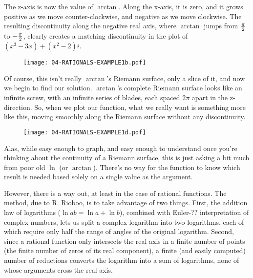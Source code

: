 The z-axis is now the value of $\arctan$.  Along the x-axis, it is
zero, and it grows positive as we move counter-clockwise, and negative
as we move clockwise.  The resulting discontinuity along the negative
real axis, where $\arctan$ jumps from $\pi\over2$ to $-{\pi\over2}$,
clearly creates a matching discontinuity in the plot of
$(x^3-3x)+(x^2-2)i$.

\begin{figure}[h]
\begin{center}
\texttt{[image: 04-RATIONALS-EXAMPLE1b.pdf]}
\end{center}
\end{figure}

Of course, this isn't really $\arctan$'s Riemann surface, only a slice
of it, and now we begin to find our solution.  $\arctan$'s complete
Riemann surface looks like an infinite screw, with an infinite series
of blades, each spaced $2\pi$ apart in the z-direction.  So, when we
plot our function, what we really want is something more like this,
moving smoothly along the Riemann surface without any discontinuity.

\begin{figure}[h]
\begin{center}
\texttt{[image: 04-RATIONALS-EXAMPLE1d.pdf]}
\end{center}
\end{figure}

Alas, while easy enough to graph, and easy enough to understand once
you're thinking about the continuity of a Riemann surface, this is
just asking a bit much from poor old $\ln$ (or $\arctan$).  There's no
way for the function to know which result is needed based solely on a
single value as the argument.

However, there is a way out, at least in the case of rational
functions.  The method, due to R. Rioboo, is to take advantage of two
things.  First, the addition law of logarithms ($\ln ab = \ln a + \ln
b$), combined with Euler-?? interpretation of complex numbers, lets us
split a complex logarithm into two logarithms, each of which require
only half the range of angles of the original logarithm.  Second,
since a rational function only intersects the real axis in a finite
number of points (the finite number of zeros of its real component), a
finite (and easily computed) number of reductions converts the
logarithm into a sum of logarithms, none of whose arguments cross
the real axis.

\vfill\eject


